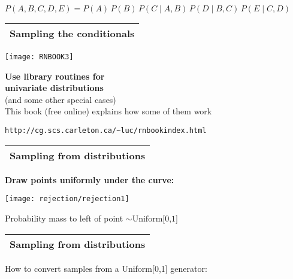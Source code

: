 \documentclass[25pt,landscape]{foils}
\newcommand{\Gray}{\textcolor{mygray}}
\newcommand{\Green}{\textcolor{mypine}}
\newcommand{\myfoilhead}[1]{
\newpage
\vspace*{-1cm}
\Gray{
\begin{tabular*}{\textwidth}{l}
{\bf \Huge #1} \\
\bottomrule
\end{tabular*}}}
\newcommand{\g}{\!\mid\!} %
\begin{document}
\vfill

$P(A,B,C,D,E) = P(A)\,P(B)\,P(C\g A,B)\,P(D\g B,C)\,P(E\g C,D)$

\myfoilhead{Sampling the conditionals}

\vspace*{1cm}

\begin{minipage}{0.45\linewidth}
    \texttt{[image: RNBOOK3]}
\end{minipage}
\begin{minipage}{0.54\linewidth}
    \Green{\bf\large Use library routines for\\ univariate distributions}\\
    (and some other special cases)\\[0.6in]

    This book (free online) explains how some of them work\\[0.4in]
\end{minipage}

\vfill

{\tt http://cg.scs.carleton.ca/\~{}luc/rnbookindex.html}


\myfoilhead{Sampling from distributions}

\vspace*{3cm}

\Green{\large\bf Draw points uniformly under the curve:}

\bigskip
\bigskip
\bigskip

\centerline{\texttt{[image: rejection/rejection1]}}

\vfill

Probability mass to left of point $\sim\mbox{Uniform[0,1]}$\\[-0.3in]
\vfill

\myfoilhead{Sampling from distributions}

\vfill

How to convert samples from a Uniform[0,1] generator:

\vfill
\end{document}
